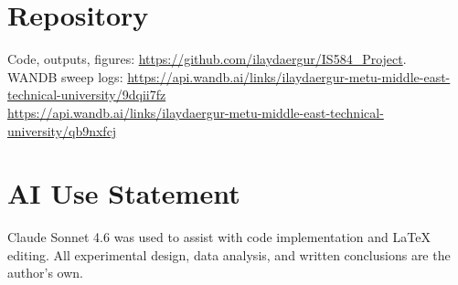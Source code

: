\documentclass[conference]{IEEEtran}
\begin{document}
\section*{Repository}

Code, outputs, figures: \url{https://github.com/ilaydaergur/IS584_Project}.\\
WANDB sweep logs:
\url{https://api.wandb.ai/links/ilaydaergur-metu-middle-east-technical-university/9dqii7fz}\\
\url{https://api.wandb.ai/links/ilaydaergur-metu-middle-east-technical-university/qb9nxfcj}

\section*{AI Use Statement}
Claude Sonnet 4.6 was used to assist with code implementation and LaTeX editing.
All experimental design, data analysis, and written conclusions are the author's own.
\end{document}
